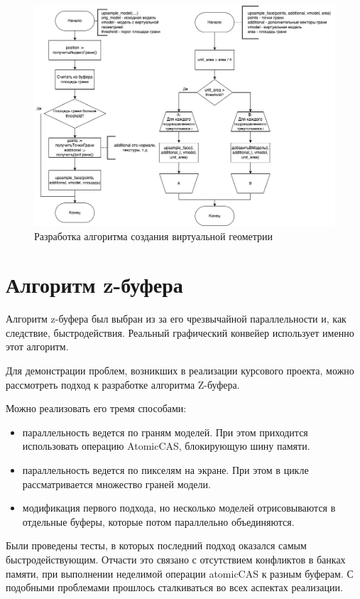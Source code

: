 \begin{figure}[ph!]
	\centering
	\includegraphics[width=1\linewidth]{img/diagrams-vgeom_upsampler.drawio.png}
	\caption{Разработка алгоритма создания виртуальной геометрии} 
	\label{fig:vgeom_create_kernel}
\end{figure}


\section{Алгоритм z-буфера}

Алгоритм z-буфера был выбран из за его чрезвычайной параллельности и, как следствие, быстродействия. Реальный графический конвейер использует именно этот алгоритм. 

Для демонстрации проблем, возникших в реализации курсового проекта, можно рассмотреть подход к разработке алгоритма Z-буфера.

Можно реализовать его тремя способами:

\begin{itemize}
	\item параллельность ведется по граням моделей. При этом приходится использовать операцию AtomicCAS, блокирующую шину памяти.
	\item параллельность ведется по пикселям на экране. При этом в цикле рассматривается множество граней модели.
	\item модификация первого подхода, но несколько моделей отрисовываются в отдельные буферы, которые потом параллельно объединяются.
\end{itemize}

Были проведены тесты, в которых последний подход оказался самым быстродействующим. Отчасти это связано с отсутствием конфликтов в банках памяти, при выполнении неделимой операции atomicCAS к разным буферам.
С подобными проблемами прошлось сталкиваться во всех аспектах реализации.

